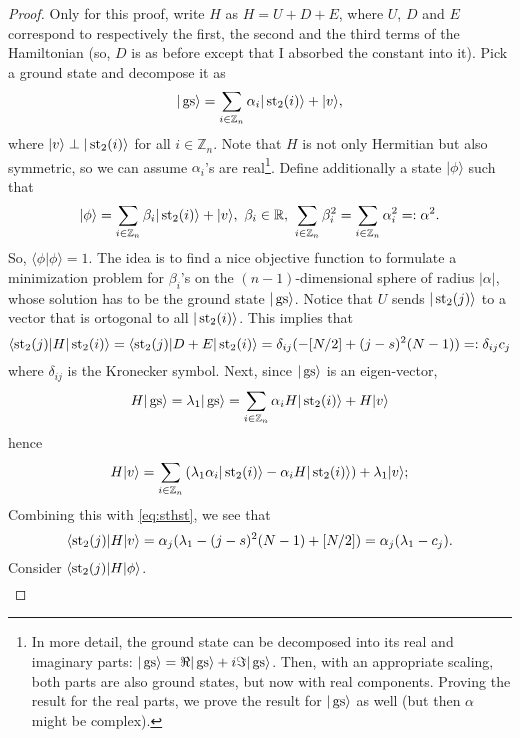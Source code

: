 \begin{proof}
Only for this proof, write $H$ as $H = U + D + E$, where $U$, $D$ and $E$ correspond to respectively the first, the second and the third terms of the Hamiltonian (so, $D$ is as before except that I absorbed the constant into it). Pick a ground state and decompose it as 
\[
|\operatorname{gs} \rangle = \sum_{i \in \mathbb Z_n} \alpha_i |\operatorname{st}_2(i)\rangle + |v\rangle,
\]
where $|v\rangle \perp |\operatorname{st}_2(i)\rangle$ for all $i \in \mathbb Z_n$. Note that $H$ is not only Hermitian but also symmetric, so we can assume $\alpha_i$'s are real\footnote{In more detail, the ground state can be decomposed into its real and imaginary parts: $|\operatorname{gs}\rangle = \Re|\operatorname{gs}\rangle + i \Im |\operatorname{gs}\rangle$. Then, with an appropriate scaling, both parts are also ground states, but now with real components. Proving the result for the real parts, we prove the result for $|\operatorname{gs}\rangle$ as well (but then $\alpha$ might be complex).}. Define additionally a state $|\phi \rangle$ such that
\[
|\phi\rangle = \sum_{i \in \mathbb Z_n} \beta_i | \operatorname{st}_2(i)\rangle + |v\rangle, \ \beta_i \in \mathbb R, \ \sum_{i\in \mathbb Z_n}\beta_i^2 = \sum_{i\in \mathbb Z_n} \alpha_i^2 =: \alpha^2.
\]
So, $\langle \phi | \phi \rangle = 1$. The idea is to find a nice objective function to formulate a minimization problem for $\beta_i$'s on the $(n-1)$-dimensional sphere of radius $|\alpha|$, whose solution has to be the ground state $|\operatorname{gs}\rangle$. Notice that $U$ sends $|\operatorname{st}_2(j)\rangle$ to a vector that is ortogonal to all $|\operatorname{st}_2(i)\rangle$. This implies that
\begin{equation}\label{eq:sthst}
\langle \operatorname{st}_2(j) | H| \operatorname{st}_2(i) \rangle = \langle \operatorname{st}_2(j)|D+E|\operatorname{st}_2(i)\rangle = \delta_{ij}(-[N/2] + (j-s)^2(N-1)) =:\delta_{ij}c_j
\end{equation}
where $\delta_{ij}$ is the Kronecker symbol.  Next, since $|\operatorname{gs}\rangle$ is an eigen-vector,
\[
H|\operatorname{gs}\rangle = \lambda_1 |\operatorname{gs}\rangle = \sum_{i \in \mathbb Z_n} \alpha_i H|\operatorname{st}_2(i)\rangle + H|v\rangle
\]
hence
\[
H|v\rangle = \sum_{i \in \mathbb Z_n}\left(\lambda_1\alpha_i |\operatorname{st}_2(i)\rangle - \alpha_iH|\operatorname{st}_2(i)\rangle\right) +\lambda_1|v\rangle;
\]
Combining this with \eqref{eq:sthst}, we see that
\[
\langle \operatorname{st}_2(j) | H|v \rangle = \alpha_j(\lambda_1 - (j-s)^2(N-1) + [N/2]) = \alpha_j(\lambda_1-c_j).
\]
Consider $\langle \operatorname{st}_2(j) |H|\phi\rangle$.%
\[\begin{split}

\end{split}\]
\end{proof}
